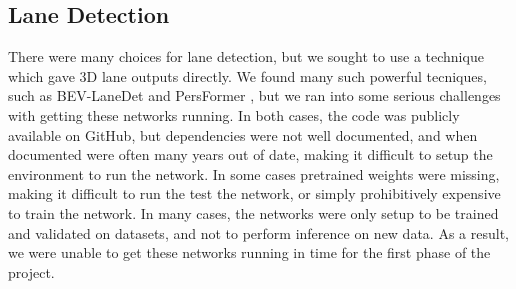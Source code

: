 \subsection{Lane Detection}
There were many choices for lane detection, but we sought to use a technique which gave 3D lane outputs directly. We found many such powerful tecniques, such as BEV-LaneDet \cite{BEV-LaneDet} and PersFormer \cite{PersFormer}, but we ran into some serious challenges with getting these networks running. In both cases, the code was publicly available on GitHub, but dependencies were not well documented, and when documented were often many years out of date, making it difficult to setup the environment to run the network. In some cases pretrained weights were missing, making it difficult to run the test the network, or simply prohibitively expensive to train the network. In many cases, the networks were only setup to be trained and validated on datasets, and not to perform inference on new data. As a result, we were unable to get these networks running in time for the first phase of the project.

